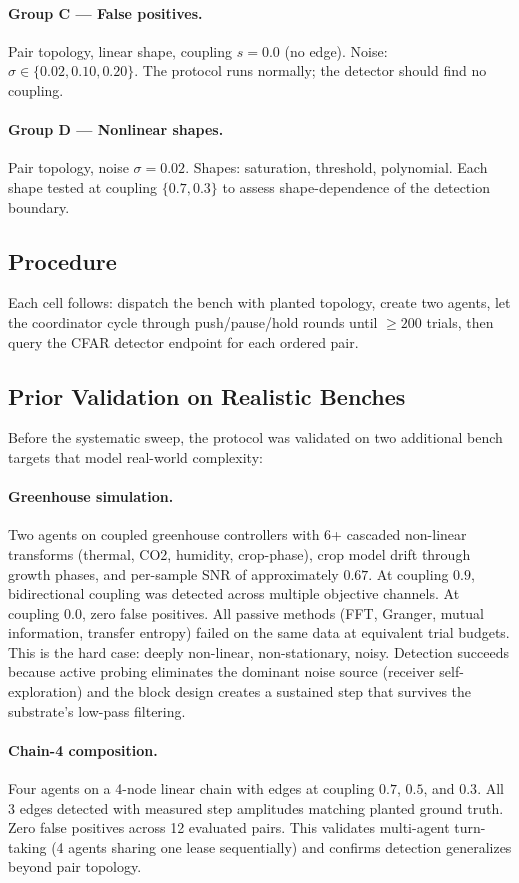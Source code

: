 \paragraph{Group C --- False positives.}
Pair topology, linear shape, coupling $s = 0.0$ (no edge).
Noise: $\sigma \in \{0.02, 0.10, 0.20\}$.
The protocol runs normally; the detector should find no coupling.

\paragraph{Group D --- Nonlinear shapes.}
Pair topology, noise $\sigma = 0.02$.
Shapes: saturation, threshold, polynomial.
Each shape tested at coupling $\{0.7, 0.3\}$ to assess
shape-dependence of the detection boundary.

\subsection{Procedure}

Each cell follows: dispatch the bench with planted topology, create
two agents, let the coordinator cycle through push/pause/hold
rounds until $\geq 200$ trials, then query the CFAR detector endpoint
for each ordered pair.

\subsection{Prior Validation on Realistic Benches}

Before the systematic sweep, the protocol was validated on two
additional bench targets that model real-world complexity:

\paragraph{Greenhouse simulation.}
Two agents on coupled greenhouse controllers with 6+ cascaded
non-linear transforms (thermal, CO2, humidity, crop-phase), crop
model drift through growth phases, and per-sample SNR of
approximately $0.67$. At coupling $0.9$, bidirectional coupling was
detected across multiple objective channels. At coupling $0.0$, zero
false positives. All passive methods (FFT, Granger, mutual
information, transfer entropy) failed on the same data at equivalent
trial budgets. This is the hard case: deeply non-linear,
non-stationary, noisy. Detection succeeds because active probing
eliminates the dominant noise source (receiver self-exploration) and
the block design creates a sustained step that survives the
substrate's low-pass filtering.

\paragraph{Chain-4 composition.}
Four agents on a 4-node linear chain with edges at coupling $0.7$,
$0.5$, and $0.3$. All 3 edges detected with measured step amplitudes
matching planted ground truth. Zero false positives across 12
evaluated pairs. This validates multi-agent turn-taking (4 agents
sharing one lease sequentially) and confirms detection generalizes
beyond pair topology.
